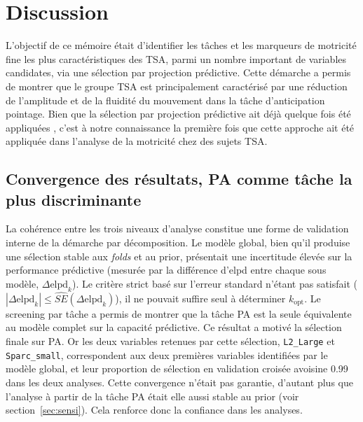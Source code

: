 \chapter{Discussion}

L'objectif de ce mémoire était d'identifier les tâches et les marqueurs de motricité fine les plus caractéristiques des TSA, parmi un nombre important de variables candidates, via une sélection par projection prédictive. Cette démarche a permis %
de montrer que le groupe TSA est principalement caractérisé par une réduction de l'amplitude et de la fluidité du mouvement dans la tâche d'anticipation pointage. Bien que la sélection par projection prédictive ait déjà quelque fois été appliquées \parencite{Wirthgen2023Jul, Sullivan2025Mar, Bratulic2022Dec}, c'est à notre connaissance la première fois que cette approche ait été appliquée dans l'analyse de la motricité chez des sujets TSA.
 
\section{Convergence des résultats, PA comme tâche la plus discriminante}

La cohérence entre les trois niveaux d'analyse constitue une forme de validation interne de la démarche par décomposition. Le modèle global, bien qu'il produise une sélection stable aux \textit{folds} et au prior, présentait une incertitude élevée sur la performance prédictive (mesurée par la différence d'elpd entre chaque sous modèle, $\Delta\text{elpd}_k$). Le critère strict basé sur l'erreur standard n'étant pas satisfait ($|\Delta\text{elpd}_k| \leq \widehat{SE}(\Delta\text{elpd}_k)$), il ne pouvait suffire seul à déterminer $k_\text{opt}$. Le screening par tâche a permis de montrer que la tâche PA est la seule équivalente au modèle complet sur la capacité prédictive. Ce résultat a motivé la sélection finale sur PA. Or les deux variables retenues par cette sélection, \texttt{L2\_Large} et \texttt{Sparc\_small}, correspondent aux deux premières variables identifiées par le modèle global, et leur proportion de sélection en validation croisée avoisine 0.99 dans les deux analyses. Cette convergence n'était pas garantie, d'autant plus que l'analyse à partir de la tâche PA était elle aussi stable au prior (voir section~\ref{sec:sensi}). Cela renforce donc la confiance dans les analyses. 

